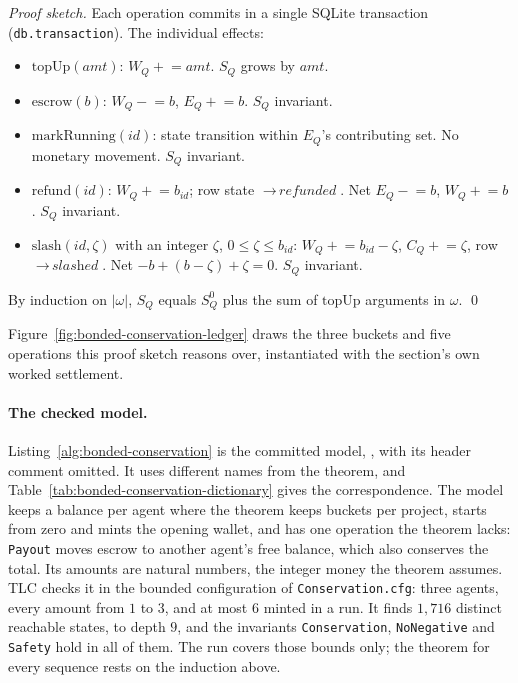 \documentclass[11pt,a4paper]{article}
\theoremstyle{definition}
\theoremstyle{remark}
\begin{document}
\begin{proof}[Proof sketch]
\setlength{\parskip}{4pt plus 1pt}
Each operation commits in a single SQLite transaction (\texttt{db.transaction}). The individual effects:
\begin{itemize}[nosep]
  \item $\mathrm{topUp}(\mathit{amt})$: $W_Q\mathrel{+}=\mathit{amt}$. $S_Q$ grows by $\mathit{amt}$.
  \item $\mathrm{escrow}(b)$: $W_Q\mathrel{-}=b$, $E_Q\mathrel{+}=b$. $S_Q$ invariant.
  \item $\mathrm{markRunning}(\mathit{id})$: state transition within $E_Q$'s contributing set. No monetary movement. $S_Q$ invariant.
  \item $\mathrm{refund}(\mathit{id})$: $W_Q\mathrel{+}=b_{\mathit{id}}$; row state $\to\,\textit{refunded}$. Net $E_Q\mathrel{-}=b$, $W_Q\mathrel{+}=b$. $S_Q$ invariant.
  \item $\mathrm{slash}(\mathit{id}, \zeta)$ with an integer $\zeta$, $0\le\zeta\le b_{\mathit{id}}$: $W_Q\mathrel{+}=b_{\mathit{id}}-\zeta$, $C_Q\mathrel{+}=\zeta$, row $\to\,\textit{slashed}$. Net $-b + (b-\zeta) + \zeta = 0$. $S_Q$ invariant.
\end{itemize}
By induction on $|\omega|$, $S_Q$ equals $S_Q^{0}$ plus the sum of $\mathrm{topUp}$ arguments in $\omega$. \qed
\end{proof}

Figure~\ref{fig:bonded-conservation-ledger} draws the three buckets and five operations this proof sketch reasons over, instantiated with the section's own worked settlement.



\paragraph{The checked model.} Listing~\ref{alg:bonded-conservation} is the
committed model, , with its
header comment omitted. It uses different names from the theorem, and
Table~\ref{tab:bonded-conservation-dictionary} gives the correspondence. The
model keeps a balance per agent where the theorem keeps buckets per project,
starts from zero and mints the opening wallet, and has one operation the
theorem lacks: \texttt{Payout} moves escrow to another agent's free balance,
which also conserves the total. Its amounts are natural numbers, the integer
money the theorem assumes. TLC checks it in the bounded configuration of
\texttt{Conservation.cfg}: three agents, every amount from $1$ to $3$, and at
most $6$ minted in a run. It finds $1{,}716$ distinct reachable states, to
depth $9$, and the invariants \texttt{Conservation}, \texttt{NoNegative} and
\texttt{Safety} hold in all of them. The run covers those bounds only; the
theorem for every sequence rests on the induction above.
\end{document}
